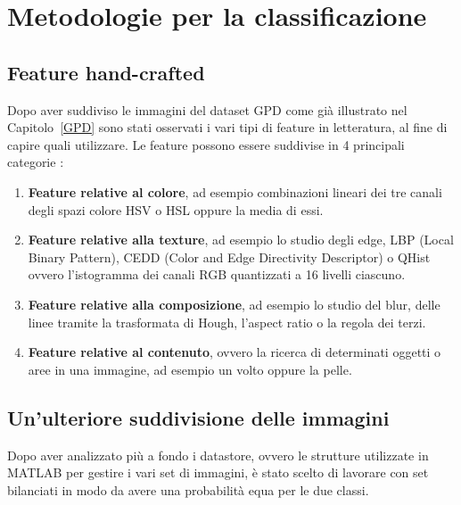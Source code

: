 \chapter{Metodologie per la classificazione}
\label{metodologie}

\section{Feature hand-crafted}
Dopo aver suddiviso le immagini del dataset GPD come già illustrato nel Capitolo~\ref{GPD} sono stati osservati i vari tipi di feature in letteratura, al fine di capire quali utilizzare. Le feature possono essere suddivise in 4 principali categorie \cite{spathis2016photo}:
\begin{enumerate}
\item \textbf{Feature relative al colore}, ad esempio combinazioni lineari dei tre canali degli spazi colore HSV o HSL oppure la media di essi. 
\item \textbf{Feature relative alla texture}, ad esempio lo studio degli edge, LBP (Local Binary Pattern), CEDD (Color and Edge Directivity Descriptor) o QHist ovvero l'istogramma dei canali RGB quantizzati a 16 livelli ciascuno.
\item \textbf{Feature relative alla composizione}, ad esempio lo studio del blur, delle linee tramite la trasformata di Hough, l'aspect ratio o la regola dei terzi.
\item \textbf{Feature relative al contenuto}, ovvero la ricerca di determinati oggetti o aree in una immagine, ad esempio un volto oppure la pelle.
\end{enumerate} 

\section{Un'ulteriore suddivisione delle immagini}
\label{divisione}
Dopo aver analizzato più a fondo i datastore, ovvero le strutture utilizzate in MATLAB \cite{MATLAB} per gestire i vari set di immagini, è stato scelto di lavorare con set bilanciati in modo da avere una probabilità equa per le due classi. 

